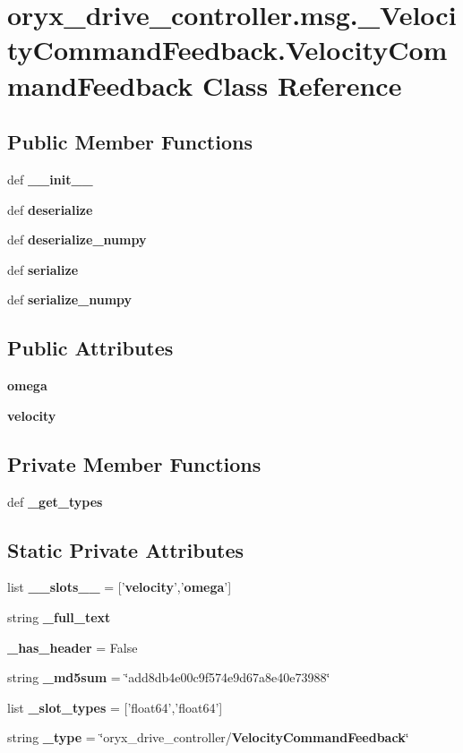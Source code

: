 \section{oryx\-\_\-drive\-\_\-controller.\-msg.\-\_\-\-Velocity\-Command\-Feedback.\-Velocity\-Command\-Feedback \-Class \-Reference}
\label{classoryx__drive__controller_1_1msg_1_1__VelocityCommandFeedback_1_1VelocityCommandFeedback}
\subsection*{\-Public \-Member \-Functions}
\begin{DoxyCompactItemize}
\item 
def {\bf \-\_\-\-\_\-init\-\_\-\-\_\-}
\item 
def {\bf deserialize}
\item 
def {\bf deserialize\-\_\-numpy}
\item 
def {\bf serialize}
\item 
def {\bf serialize\-\_\-numpy}
\end{DoxyCompactItemize}
\subsection*{\-Public \-Attributes}
\begin{DoxyCompactItemize}
\item 
{\bf omega}
\item 
{\bf velocity}
\end{DoxyCompactItemize}
\subsection*{\-Private \-Member \-Functions}
\begin{DoxyCompactItemize}
\item 
def {\bf \-\_\-get\-\_\-types}
\end{DoxyCompactItemize}
\subsection*{\-Static \-Private \-Attributes}
\begin{DoxyCompactItemize}
\item 
list {\bf \-\_\-\-\_\-slots\-\_\-\-\_\-} = ['{\bf velocity}','{\bf omega}']
\item 
string {\bf \-\_\-full\-\_\-text}
\item 
{\bf \-\_\-has\-\_\-header} = \-False
\item 
string {\bf \-\_\-md5sum} = \char`\"{}add8db4e00c9f574e9d67a8e40e73988\char`\"{}
\item 
list {\bf \-\_\-slot\-\_\-types} = ['float64','float64']
\item 
string {\bf \-\_\-type} = \char`\"{}oryx\-\_\-drive\-\_\-controller/{\bf \-Velocity\-Command\-Feedback}\char`\"{}
\end{DoxyCompactItemize}



